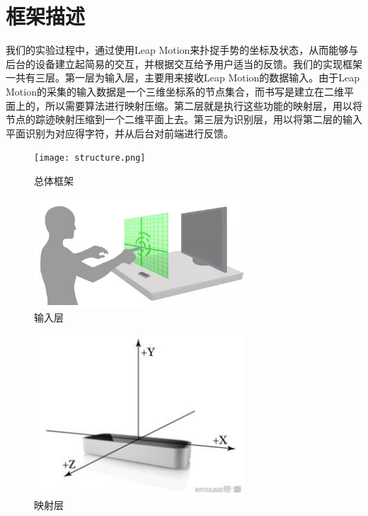 \documentclass[10pt, twocolumn]{article}
\begin{document}
\section{框架描述}
	我们的实验过程中，通过使用Leap Motion来扑捉手势的坐标及状态，从而能够与后台的设备建立起简易的交互，并根据交互给予用户适当的反馈。我们的实现框架一共有三层。第一层为输入层，主要用来接收Leap Motion的数据输入。由于Leap Motion的采集的输入数据是一个三维坐标系的节点集合，而书写是建立在二维平面上的，所以需要算法进行映射压缩。第二层就是执行这些功能的映射层，用以将节点的踪迹映射压缩到一个二维平面上去。第三层为识别层，用以将第二层的输入平面识别为对应得字符，并从后台对前端进行反馈。

\begin{figure}[htb]
\centering
\begin{minipage}[t]{1\linewidth}
\centering
\texttt{[image: structure.png]}
\caption{总体框架}
\label{fig: structure}
\end{minipage}
\end{figure}



\begin{figure}[htb]
\centering
\begin{minipage}[t]{1\linewidth}
\centering
\includegraphics[width=8cm]{input.jpg}
\caption{输入层}
\label{fig: input_layer}
\end{minipage}
\end{figure}



\begin{figure}[htb]
\centering
\begin{minipage}[t]{1\linewidth}
\centering
\includegraphics[width=8cm, height = 6cm]{map.jpg}
\caption{映射层}
\label{fig: hidden_layer}
\end{minipage}
\end{figure}
\end{document}
